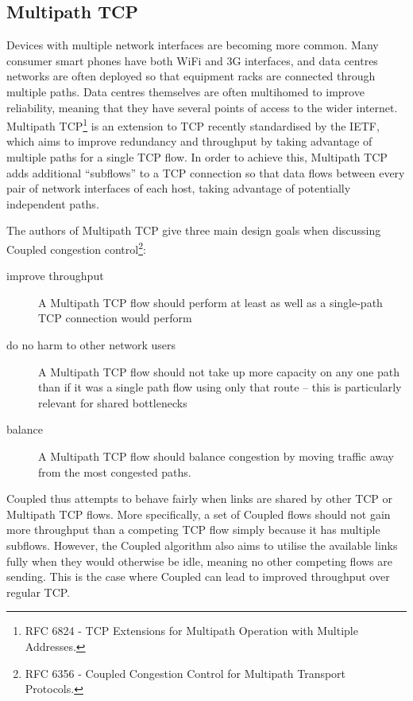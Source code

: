 \subsection{Multipath TCP}
\label{sec:bg:mptcp}
Devices with multiple network interfaces are becoming more common. Many consumer
smart phones have both WiFi and 3G interfaces, and data centres networks are
often deployed so that equipment racks are connected through multiple paths.
Data centres themselves are often multihomed to improve reliability, meaning
that they have several points of access to the wider internet. Multipath
TCP\footnote{RFC 6824 - TCP Extensions for Multipath Operation with Multiple
Addresses.} is an extension to TCP recently standardised by the IETF, which aims
to improve redundancy and throughput by taking advantage of multiple paths for a
single TCP flow. In order to achieve this, Multipath TCP adds additional
``subflows'' to a TCP connection so that data flows between every pair of
network interfaces of each host, taking advantage of potentially independent
paths.


The authors of Multipath TCP give three main design goals when discussing
Coupled congestion control\footnote{RFC 6356 - Coupled Congestion Control for
Multipath Transport Protocols.}:

\begin{description}
  \item[improve throughput] A Multipath TCP flow should perform at least as well
    as a single-path TCP connection would perform
  \item[do no harm to other network users] A Multipath TCP flow should not take
    up more capacity on any one path than if it was a single path flow using
    only that route -- this is particularly relevant for shared bottlenecks
  \item[balance] A Multipath TCP flow should balance congestion by moving
    traffic away from the most congested paths.
\end{description}

Coupled thus attempts to behave fairly when links are shared by other TCP or
Multipath TCP flows. More specifically, a set of Coupled flows should not gain
more throughput than a competing TCP flow simply because it has multiple
subflows. However, the Coupled algorithm also aims to utilise the available
links fully when they would otherwise be idle, meaning no other competing flows
are sending. This is the case where Coupled can lead to improved throughput over
regular TCP.

